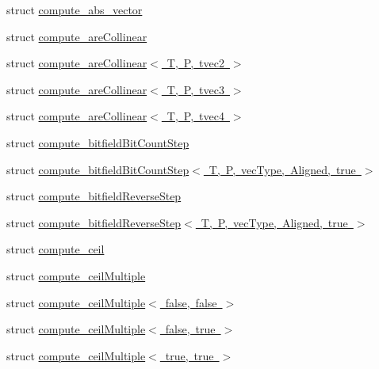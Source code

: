 \begin{DoxyCompactItemize}
\item 
struct \mbox{\hyperlink{structglm_1_1detail_1_1compute__abs__vector}{compute\+\_\+abs\+\_\+vector}}
\item 
struct \mbox{\hyperlink{structglm_1_1detail_1_1compute__are_collinear}{compute\+\_\+are\+Collinear}}
\item 
struct \mbox{\hyperlink{structglm_1_1detail_1_1compute__are_collinear_3_01_t_00_01_p_00_01tvec2_01_4}{compute\+\_\+are\+Collinear$<$ T, P, tvec2 $>$}}
\item 
struct \mbox{\hyperlink{structglm_1_1detail_1_1compute__are_collinear_3_01_t_00_01_p_00_01tvec3_01_4}{compute\+\_\+are\+Collinear$<$ T, P, tvec3 $>$}}
\item 
struct \mbox{\hyperlink{structglm_1_1detail_1_1compute__are_collinear_3_01_t_00_01_p_00_01tvec4_01_4}{compute\+\_\+are\+Collinear$<$ T, P, tvec4 $>$}}
\item 
struct \mbox{\hyperlink{structglm_1_1detail_1_1compute__bitfield_bit_count_step}{compute\+\_\+bitfield\+Bit\+Count\+Step}}
\item 
struct \mbox{\hyperlink{structglm_1_1detail_1_1compute__bitfield_bit_count_step_3_01_t_00_01_p_00_01vec_type_00_01_aligned_00_01true_01_4}{compute\+\_\+bitfield\+Bit\+Count\+Step$<$ T, P, vec\+Type, Aligned, true $>$}}
\item 
struct \mbox{\hyperlink{structglm_1_1detail_1_1compute__bitfield_reverse_step}{compute\+\_\+bitfield\+Reverse\+Step}}
\item 
struct \mbox{\hyperlink{structglm_1_1detail_1_1compute__bitfield_reverse_step_3_01_t_00_01_p_00_01vec_type_00_01_aligned_00_01true_01_4}{compute\+\_\+bitfield\+Reverse\+Step$<$ T, P, vec\+Type, Aligned, true $>$}}
\item 
struct \mbox{\hyperlink{structglm_1_1detail_1_1compute__ceil}{compute\+\_\+ceil}}
\item 
struct \mbox{\hyperlink{structglm_1_1detail_1_1compute__ceil_multiple}{compute\+\_\+ceil\+Multiple}}
\item 
struct \mbox{\hyperlink{structglm_1_1detail_1_1compute__ceil_multiple_3_01false_00_01false_01_4}{compute\+\_\+ceil\+Multiple$<$ false, false $>$}}
\item 
struct \mbox{\hyperlink{structglm_1_1detail_1_1compute__ceil_multiple_3_01false_00_01true_01_4}{compute\+\_\+ceil\+Multiple$<$ false, true $>$}}
\item 
struct \mbox{\hyperlink{structglm_1_1detail_1_1compute__ceil_multiple_3_01true_00_01true_01_4}{compute\+\_\+ceil\+Multiple$<$ true, true $>$}}

\end{DoxyCompactItemize}
